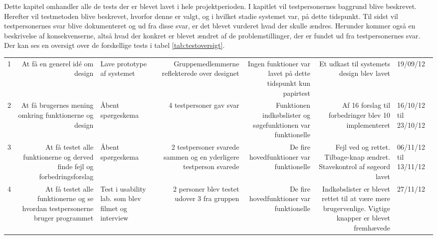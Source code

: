 Dette kapitel omhandler alle de tests der er blevet lavet i hele projektperioden. I kapitlet vil testpersonernes baggrund blive beskrevet. Herefter vil testmetoden blive beskrevet, hvorfor denne er valgt, og i hvilket stadie systemet var, på dette tidspunkt. Til sidst vil testpersonernes svar blive dokumenteret og ud fra disse svar, er det blevet vurderet hvad der skulle ændres. Herunder kommer også en beskrivelse af konsekvenserne, altså hvad der konkret er blevet ændret af de problemstillinger, der er fundet ud fra testpersonernes svar. Der kan ses en oversigt over de forskellige tests i tabel \ref{tab:testoversigt}.

\begin{table}[H]
\begin{adjustwidth}{-50pt}{50pt}

\begin{tabularx}{\textwidth + 100pt}{|l|R|p{1.7cm}|R|R|R|p{1.5cm}|}
\hline
          &  &   &   &   &   &   \\  & At få en generel idé om design & Lave prototype af systemet &\hspace{0pt}Gruppemedlemmerne reflekterede over designet & Ingen funktioner var lavet på dette tidspunkt kun papirtest & Et udkast til systemets design blev lavet & 19/09/12 \\ \hline

2 & At få brugernes mening omkring funktionerne og design & Åbent spørgeskema & 4 testpersoner gav svar & Funktionen indkøbslister og søgefunktionen var funktionelle &  Af 16 forslag til forbedringer blev 10 implementeret & 16/10/12 til 23/10/12  \\ \hline

3 & At få testet alle funktionerne og derved finde fejl og forbedringsforslag & Åbent spørgeskema & 2 testpersoner svarede sammen og en yderligere testperson svarede & De fire hovedfunktioner var funktionelle &  Fejl ved  og  rettet. Tilbage-knap ændret. Stavekontrol af søgeord lavet & 06/11/12 til 13/11/12 \\ \hline

4 & At få testet alle funktionerne og se hvordan testpersonerne bruger programmet & Test i usability lab. som blev filmet og interview  & 2 personer blev testet udover 3 fra gruppen & De fire hovedfunktioner var funktionelle & Indkøbslister er blevet rettet til at være mere brugervenlige. Vigtige knapper er blevet fremhævede & 27/11/12 \\ \hline


\end{tabularx}
\end{adjustwidth}
\end{table}
